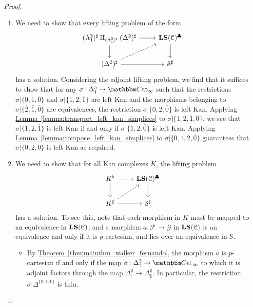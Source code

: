 \documentclass[main.tex]{subfiles}
\begin{document}
\begin{proof}
\begin{enumerate}
    \item We need to show that every lifting problem of the form
      \begin{equation*}
        \begin{tikzcd}
          (\Lambda^{2}_{1})^{\sharp} \amalg_{( \Lambda^{2}_{1} )^{\flat}}(\Delta^{2})^{\sharp}
          \arrow[r]
          \arrow[d]
          & \LS(\category{C})^{\clubsuit}
          \arrow[d]
          \\
          (\Delta^{2})^{\sharp}
          \arrow[r]
          \arrow[ur, dashed]
          & \S^{\sharp}
        \end{tikzcd}
      \end{equation*}
      has a solution. Considering the adjoint lifting problem, we find that it suffices to show that for any $\sigma\colon  \Delta^{5}_{\dagger} \to \ICCat$ such that the restrictions $\sigma|\{0,1,\overline{0}\}$ and $\sigma|\{1,2,\overline{1}\}$ are left Kan and the morphisms belonging to $\sigma|\{\overline{2}, \overline{1}, \overline{0}\}$ are equivalences, the restriction $\sigma|\{0,2,\overline{0}\}$ is left Kan. Applying \hyperref[lemma:transport_left_kan_simplices]{Lemma~\ref*{lemma:transport_left_kan_simplices}} to $\sigma|\{1,2,\overline{1},\overline{0}\}$, we see that $\sigma|\{1,2,\overline{1}\}$ is left Kan if and only if $\sigma|\{1,2,\overline{0}\}$ is left Kan. Applying \hyperref[lemma:compose_left_kan_simplices]{Lemma~\ref*{lemma:compose_left_kan_simplices}} to $\sigma|\{0,1,2,\overline{0}\}$ guarantees that $\sigma|\{0,2,\overline{0}\}$ is left Kan as required.


    \item We need to show that for all Kan complexes $K$, the lifting problem
      \begin{equation*}
        \begin{tikzcd}
          K^{\flat}
          \arrow[r]
          \arrow[d]
          & \LS(\category{C})^{\clubsuit}
          \arrow[d]
          \\
          K^{\sharp}
          \arrow[r]
          \arrow[ur, dashed]
          & \S^{\sharp}
        \end{tikzcd}
      \end{equation*}
      has a solution. To see this, note that each morphism in $K$ must be mapped to an equivalence in $\LS(\category{C})$, and a morphism $a\colon \mathcal{F} \to \mathcal{G}$ in $\LS(\category{C})$ is an equivalence and only if it is $p$-cartesian, and lies over an equivalence in $\S$.
      \begin{itemize}
        \item By \hyperref[thm:mainthm_walker_fernando]{Theorem~\ref*{thm:mainthm_walker_fernando}}, the morphism $a$ is $p$-cartesian if and only if the map $\sigma\colon \Delta^{3}_{\dagger} \to \ICCat$ to which it is adjoint factors through the map $\Delta^{3}_{\dagger} \to \Delta^{3}_{\sharp}$. In particular, the restriction $\sigma|\Delta^{\{0,1,\overline{0}\}}$ is thin.


\end{itemize}
\end{enumerate}
\end{proof}
\end{document}
